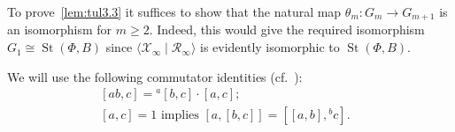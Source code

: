 \documentclass[oneside, 10pt]{amsart}
\DeclareMathOperator{\St}{St}
\newcommand{\XX}[1]{\mathcal{X}_{#1}}
\newcommand{\RR}[1]{\mathcal{R}_{#1}}
\numberwithin{equation}{section}
\numberwithin{lemma}{section}
\theoremstyle{definition}
\theoremstyle{remark}
\newtheorem{rem}[lemma]{Remark}
\begin{document}
To prove~\cref{lem:tul3.3} it suffices to show that the natural map $\theta_m \colon G_m \to G_{m+1}$ is an isomorphism for $m\geq 2$.
Indeed, this would give the required isomorphism $G_1 \cong \St(\Phi, B)$ since $\langle \XX{\infty} \mid \RR{\infty} \rangle$ is evidently isomorphic to $\St(\Phi, B)$.


We will use the following commutator identities (cf.~\cite[H1]{Re75}):
\begin{align}
 \label{eq:H1ii}  [ab, c] = {}^a[b, c] \cdot [a,c];&\\ %
 \label{eq:H1iii} [a,c]   = 1    \text{ implies } [a, [b,c]] = [[a,b],{}^bc].&
\end{align}
\end{document}
